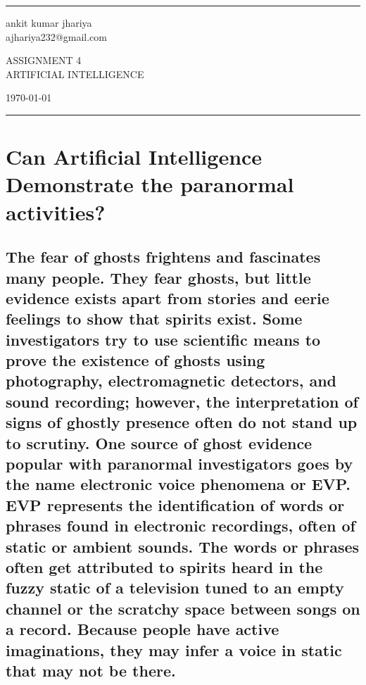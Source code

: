 \documentclass[a4paper]{article}
\begin{document}

\fancyhead[C]{}
\hrule \medskip %
\begin{minipage}{0.295\textwidth} 
\raggedright
\footnotesize
ankit kumar jhariya\hfill\\   
ajhariya232@gmail.com\hfill\\
\end{minipage}
\begin{minipage}{0.4\textwidth} 
\centering 
\large 
ASSIGNMENT 4\\ 
\normalsize 
ARTIFICIAL INTELLIGENCE\\ 
\end{minipage}
\begin{minipage}{0.295\textwidth} 
\raggedleft
\today\hfill\\
\end{minipage}
\medskip\hrule 
\bigskip


\section{Can Artificial Intelligence Demonstrate the paranormal activities?}

\subsection{ The fear of ghosts frightens and fascinates many people.  They fear ghosts, but little evidence exists apart from stories and eerie feelings to show that spirits exist.  Some investigators try to use scientific means to prove the existence of ghosts using photography, electromagnetic detectors, and sound recording; however, the interpretation of signs of ghostly presence often do not stand up to scrutiny.  One source of ghost evidence popular with paranormal investigators goes by the name electronic voice phenomena or EVP.  EVP represents the identification of words or phrases found in electronic recordings, often of static or ambient sounds.  The words or phrases often get attributed to spirits heard in the fuzzy static of a television tuned to an empty channel or the scratchy space between songs on a record.  Because people have active imaginations, they may infer a voice in static that may not be there.  }
\end{document}
